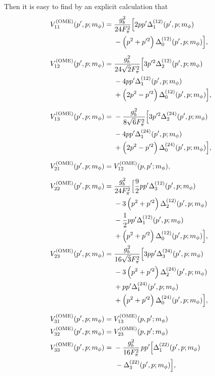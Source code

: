 \documentclass[aps,prd,showpacs,amsmath,twocolumn,superscriptaddress,floatfix,nofootinbib,notitlepage]{revtex4-2}
\newcommand{\mG}{m_\phi}
\begin{document}
Then it is easy to find by an explicit calculation that 
\begin{align}
V_{11}^{\rm (OME)}(p',p;\mG)={}&\frac{g_b^2}{24 F_\pi^2}
\Bigl[2pp^{\prime}\Delta^{(12)}_1(p',p;\mG)\notag\\
&-\left(p^2+p^{\prime2}\right)\Delta^{(12)}_0(p',p;\mG)\Bigr],
\label{eq:OPES}
\\[2mm]
V_{12}^{\rm (OME)}(p',p;\mG)={}&\frac{g_b^2}{24\sqrt{2} F_{\pi}^2}
\Bigl[3 p^{\prime2}\Delta^{(12)}_2(p',p;\mG)\notag\\
&-4pp^{\prime}\Delta^{(12)}_1(p',p;\mG)
\label{eq:OPESD}\\
&+\left(
2p^2-p^{\prime2}\right)\Delta^{(12)}_0(p',p;\mG)\Bigr],
\notag\\[2mm]
V_{13}^{\rm (OME)}(p',p;\mG)={}&-\frac{g_b^2}{8\sqrt{6} F_{\pi}^2}
\Bigl[3 p^{\prime2}\Delta^{(24)}_2(p',p;\mG)
\notag\\
&-4pp^{\prime}\Delta^{(24)}_1(p',p;\mG)
\label{eq:OPESDstar}\\
&+\left(2p^{2}-p^{\prime2}\right)\Delta^{(24)}_0(p',p;\mG)\Bigr],
\notag\\[2mm]
V_{21}^{\rm (OME)}(p',p;\mG)={}&V_{12}^{\rm (OME)}(p,p';\mG),\\[2mm]
V_{22}^{\rm (OME)}(p',p;\mG)={}&\frac{g_b^2}{24 F_{\pi}^2}
\Bigl[\frac92pp^{\prime}\Delta^{(12)}_3(p',p;\mG)\notag\\
&-3\left(p^2+p^{\prime2}\right)\Delta^{(12)}_2(p',p;\mG)\notag\\
&-\frac12pp^{\prime}\Delta^{(12)}_1(p',p;\mG)\label{eq:OPED}\\
&+\left(p^2+p^{\prime2}\right)\Delta^{(12)}_0(p',p;\mG)\Bigr],
\notag\\
V_{23}^{\rm (OME)}(p',p;\mG)={}&\frac{g_b^2}{16\sqrt{3} F_{\pi}^2}
\Bigl[3pp^{\prime}\Delta^{(24)}_3(p',p;\mG)\notag\\
&-3\left(p^2+p^{\prime2}\right)\Delta^{(24)}_2(p',p;\mG)\notag\\
&+pp^{\prime}\Delta^{(24)}_1(p',p;\mG)\label{eq:OPEDDstar}\\
&+\left(p^2+p^{\prime2}\right)\Delta^{(24)}_0(p',p;\mG)\Bigr],
\notag\\[2mm]
V_{31}^{\rm (OME)}(p',p;\mG)={}&V_{13}^{\rm (OME)}(p,p';\mG) \\
V_{32}^{\rm (OME)}(p',p;\mG)={}&V_{23}^{\rm (OME)}(p,p';\mG)\\
V_{33}^{\rm (OME)}(p',p;\mG)={}&-\frac{g_b^2}{16 F_{\pi}^2}\,pp^{\prime}
\Bigl[\Delta^{(22)}_1(p',p;\mG)\notag\\
&\,-\Delta^{(22)}_3(p',p;\mG)\Bigr],
\label{eq:OPEDstarDstar}
\end{align}
\end{document}
